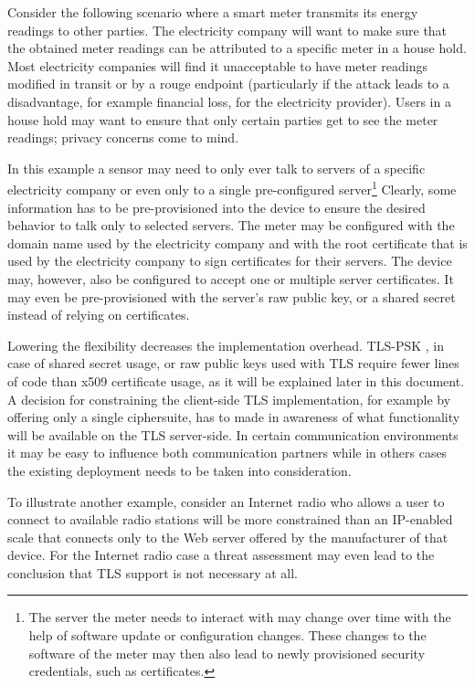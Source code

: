\documentclass[a4paper, 10pt]{IEEEtran}
\begin{document}
Consider the following scenario where a smart meter transmits its energy readings to other parties. The electricity company will want to make sure that the obtained meter readings can be attributed to a specific meter in a house hold. Most electricity companies will find it unacceptable to have meter readings modified in transit or by a rouge endpoint (particularly if the attack leads to a disadvantage, for example financial loss, for the electricity provider). Users in a house hold may want to ensure that only certain parties get to see the meter readings; privacy concerns come to mind.  

In this example a sensor may need to only ever talk to servers of a specific electricity company or even only to a single pre-configured server\footnote{The server the meter needs to interact with may change over time with the help of software update or configuration changes. These changes to the software of the meter may then also lead to newly provisioned security credentials, such as certificates.} Clearly, some information has to be pre-provisioned into the device to ensure the desired behavior to talk only to selected servers. The meter may be configured with the domain name used by the electricity company and with the root certificate that is used by the electricity company to sign certificates for their servers. The device may, however, also be configured to accept one or multiple server certificates. It may even be pre-provisioned with the server's raw public key, or a shared secret instead of relying on certificates.

Lowering the flexibility decreases the implementation overhead. TLS-PSK \cite{rfc4279}, in case of shared secret usage, or raw public keys used with TLS \cite{I-d.ietf-tls-oob-pubkey} require fewer lines of code than x509 certificate usage, as it will be explained later in this document. A decision for constraining the client-side TLS implementation, for example by offering only a single ciphersuite, has to made in awareness of what functionality will be available on the TLS server-side. In certain communication environments it may be easy to influence both communication partners while in others cases the existing deployment needs to be taken into consideration. 

To illustrate another example, consider an Internet radio who allows a user to connect to available radio stations will be more constrained than an IP-enabled scale that connects only to the Web server offered by the manufacturer of that device. For the Internet radio case a threat assessment may even lead to the conclusion that TLS support is not necessary at all. 
\end{document}
